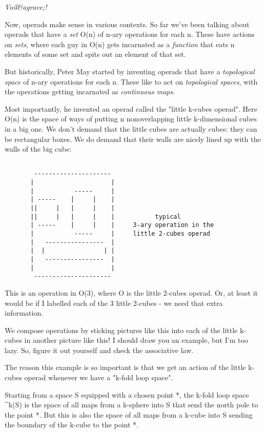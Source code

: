 \emph{Voil&agrave;!}

Now, operads make sense in various contexts.  So far we've been 
talking about operads that have a \emph{set} O(n) of n-ary operations 
for each n.  These have actions on \emph{sets}, where each guy in O(n) 
gets incarnated as a \emph{function} that eats n elements of some set 
and spits out an element of that set. 

But historically, Peter May started by inventing operads that have 
a \emph{topological space} of n-ary operations for each n.  These like 
to act on \emph{topological spaces}, with the operations getting 
incarnated as \emph{continuous maps}.     

Most importantly, he invented an operad called the "little k-cubes 
operad".  Here O(n) is the space of ways of putting n nonoverlapping
little k-dimensional cubes in a big one.  We don't demand that
the little cubes are actually cubes: they can be rectangular
boxes.  We do demand that their walls are nicely lined up with 
the walls of the big cube:



\begin{verbatim}

        ---------------------
       |                     |
       |           -----     |
       | -----    |     |    | 
       ||     |   |     |    |
       ||     |   |     |    |           typical  
       | -----    |     |    |     3-ary operation in the       
       |           -----     |     little 2-cubes operad
       |   ----------------  |
       |  |                | |
       |   ----------------  |
       |                     |
        ---------------------

\end{verbatim}
    
This is an operation in O(3), where O is the little 2-cubes
operad.  Or, at least it would be if I labelled each of the 3 
little 2-cubes - we need that extra information.  

We compose operations by sticking pictures like this into 
each of the little k-cubes in another picture like this!  
I should draw you an example, but I'm too lazy.  So, figure
it out yourself and check the associative law.

The reason this example is so important is that we get an action
of the little k-cubes operad whenever we have a "k-fold loop 
space".  

Starting from a space S equipped with a chosen point *, the 
k-fold loop space \Omega ^{k}(S) is the space of all maps from
a k-sphere into S that send the north pole to the point *.  But
this is also the space of all maps from a k-cube into S sending 
the boundary of the k-cube to the point *.  

